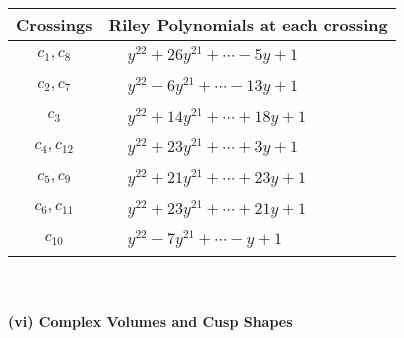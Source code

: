 \documentclass[1p]{elsarticle_modified}
\theoremstyle{definition}
\begin{document}
\begin{tabular}{m{50pt}|m{274pt}}
Crossings & \hspace{64pt}Riley Polynomials at each crossing \\
\hline $$\begin{aligned}c_{1},c_{8}\end{aligned}$$&$\begin{aligned}
&y^{22}+26 y^{21}+\cdots-5 y+1
\end{aligned}$\\
\hline $$\begin{aligned}c_{2},c_{7}\end{aligned}$$&$\begin{aligned}
&y^{22}-6 y^{21}+\cdots-13 y+1
\end{aligned}$\\
\hline $$\begin{aligned}c_{3}\end{aligned}$$&$\begin{aligned}
&y^{22}+14 y^{21}+\cdots+18 y+1
\end{aligned}$\\
\hline $$\begin{aligned}c_{4},c_{12}\end{aligned}$$&$\begin{aligned}
&y^{22}+23 y^{21}+\cdots+3 y+1
\end{aligned}$\\
\hline $$\begin{aligned}c_{5},c_{9}\end{aligned}$$&$\begin{aligned}
&y^{22}+21 y^{21}+\cdots+23 y+1
\end{aligned}$\\
\hline $$\begin{aligned}c_{6},c_{11}\end{aligned}$$&$\begin{aligned}
&y^{22}+23 y^{21}+\cdots+21 y+1
\end{aligned}$\\
\hline $$\begin{aligned}c_{10}\end{aligned}$$&$\begin{aligned}
&y^{22}-7 y^{21}+\cdots- y+1
\end{aligned}$\\
\hline
\end{tabular}\\~\\
\newpage\flushleft \textbf{(vi) Complex Volumes and Cusp Shapes}
\end{document}
